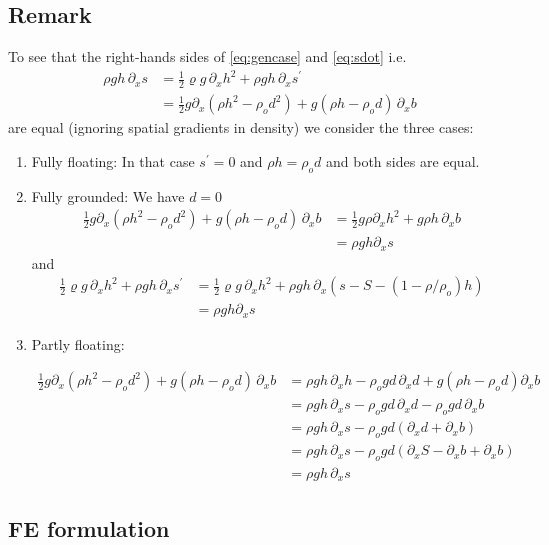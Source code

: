 \documentclass[10pt,a4paper]{book}
\newcommand{\p}{\partial}
\begin{document}
\subsection{Remark}
To see that the right-hands sides of  \eqref{eq:gencase} and \eqref{eq:sdot} i.e.\
\begin{align*}
\rho g h \, \p_x s &=\frac{1}{2} \varrho g \,\p_x h^2 +\rho g h \, \p_x s^{'} \\
&=\frac{1}{2} g \p_x (\rho h^2 - \rho_o d^2) + g (\rho h -\rho_o d) \, \p_x b
\end{align*}
are equal (ignoring spatial gradients in density) we consider the
three cases:

\begin{enumerate}
\item Fully floating:  In that case $s^{'}=0$ and $\rho h =\rho_o d$ and both sides are equal.
\item Fully grounded: We have $d=0$
\begin{align*}
\frac{1}{2} g \p_x (\rho h^2 - \rho_o d^2) + g (\rho h -\rho_o d) \, \p_x b 
&= \frac{1}{2} g \rho \p_x  h^2  + g \rho h  \, \p_x b\\
&= \rho g h \p_ x s
\end{align*}
and
\begin{align*}
\frac{1}{2} \varrho g \,\p_x h^2 +\rho g h \, \p_x s^{'} 
&=  \frac{1}{2} \varrho g \,\p_x h^2 +\rho g h \, \p_x (s-S-(1-\rho/\rho_o) h) \\
&=\rho g h \p_ x s
\end{align*}
\item Partly floating:


\begin{align*}
\frac{1}{2} g \p_x (\rho h^2 - \rho_o d^2) + g (\rho h -\rho_o d) \, \p_x b 
&=\rho g h \, \p_x h -\rho_o g d \, \p_x d + g ( \rho h -\rho_o d ) \p_x b \\
&=\rho g h \, \p_x s - \rho_o g d \, \p_x d - \rho_o g d \, \p_x b \\
&= \rho g h \, \p_x s - \rho_o g d (\p_x d + \p_x b)\\
&= \rho g h \, \p_x s - \rho _o g d ( \p_x S- \p_x b + \p_x b)\\
&=\rho g h \, \p_x s
\end{align*}
\end{enumerate}

\subsection{FE formulation}
\end{document}
